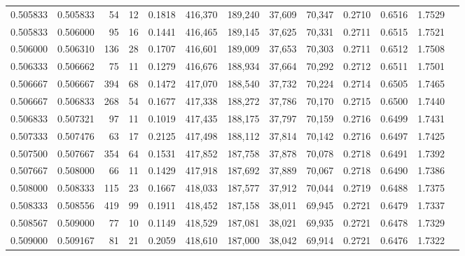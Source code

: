 \begin{tabular}{rrrrrrrrrrrrr}
0.505833 & 0.505833 &    54 &  12 &                                     0.1818 & 416,370 & 189,240 &  37,609 &  70,347 & 0.2710 & 0.6516 & 1.7529 \\
0.505833 & 0.506000 &    95 &  16 &                                     0.1441 & 416,465 & 189,145 &  37,625 &  70,331 & 0.2711 & 0.6515 & 1.7521 \\
0.506000 & 0.506310 &   136 &  28 &                                     0.1707 & 416,601 & 189,009 &  37,653 &  70,303 & 0.2711 & 0.6512 & 1.7508 \\
0.506333 & 0.506662 &    75 &  11 &                                     0.1279 & 416,676 & 188,934 &  37,664 &  70,292 & 0.2712 & 0.6511 & 1.7501 \\
0.506667 & 0.506667 &   394 &  68 &                                     0.1472 & 417,070 & 188,540 &  37,732 &  70,224 & 0.2714 & 0.6505 & 1.7465 \\
0.506667 & 0.506833 &   268 &  54 &                                     0.1677 & 417,338 & 188,272 &  37,786 &  70,170 & 0.2715 & 0.6500 & 1.7440 \\
0.506833 & 0.507321 &    97 &  11 &                                     0.1019 & 417,435 & 188,175 &  37,797 &  70,159 & 0.2716 & 0.6499 & 1.7431 \\
0.507333 & 0.507476 &    63 &  17 &                                     0.2125 & 417,498 & 188,112 &  37,814 &  70,142 & 0.2716 & 0.6497 & 1.7425 \\
0.507500 & 0.507667 &   354 &  64 &                                     0.1531 & 417,852 & 187,758 &  37,878 &  70,078 & 0.2718 & 0.6491 & 1.7392 \\
0.507667 & 0.508000 &    66 &  11 &                                     0.1429 & 417,918 & 187,692 &  37,889 &  70,067 & 0.2718 & 0.6490 & 1.7386 \\
0.508000 & 0.508333 &   115 &  23 &                                     0.1667 & 418,033 & 187,577 &  37,912 &  70,044 & 0.2719 & 0.6488 & 1.7375 \\
0.508333 & 0.508556 &   419 &  99 &                                     0.1911 & 418,452 & 187,158 &  38,011 &  69,945 & 0.2721 & 0.6479 & 1.7337 \\
0.508567 & 0.509000 &    77 &  10 &                                     0.1149 & 418,529 & 187,081 &  38,021 &  69,935 & 0.2721 & 0.6478 & 1.7329 \\
0.509000 & 0.509167 &    81 &  21 &                                     0.2059 & 418,610 & 187,000 &  38,042 &  69,914 & 0.2721 & 0.6476 & 1.7322 \\

\end{tabular}
